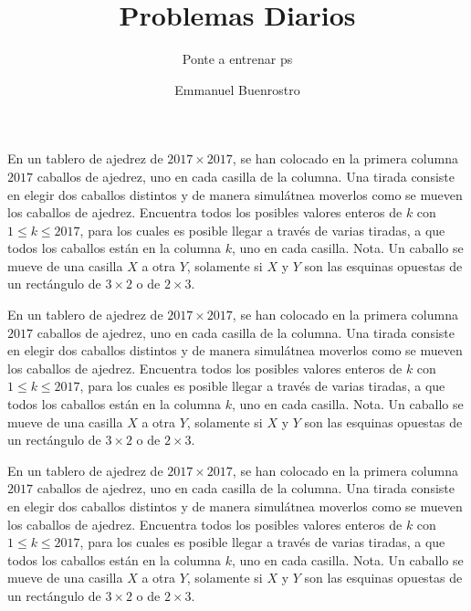 \documentclass[11pt]{scrartcl}
\title {Problemas Diarios}
\subtitle {Ponte a entrenar ps}
\author{Emmanuel Buenrostro}
\begin{document}
\maketitle
\tableofcontents
{}
\begin{problema} [OMM 2017/1]
    
    En un tablero de ajedrez de $2017 \times 2017$, se han colocado en la primera columna $2017$
caballos de ajedrez, uno en cada casilla de la columna. Una tirada consiste en elegir dos
caballos distintos y de manera simulátnea moverlos como se mueven los caballos de ajedrez.
Encuentra todos los posibles valores enteros de $k$ con $1 \leq k \leq 2017$, para los cuales es
posible llegar a través de varias tiradas, a que todos los caballos están en la columna $k$, uno
en cada casilla.
Nota. Un caballo se mueve de una casilla $X$ a otra $Y$, solamente si $X$ y $Y$ son las esquinas
opuestas de un rectángulo de $3 \times 2$ o de $2 \times 3$.
    
\end{problema}
\begin{problema} [OMM 2017/1]
    
    En un tablero de ajedrez de $2017 \times 2017$, se han colocado en la primera columna $2017$
caballos de ajedrez, uno en cada casilla de la columna. Una tirada consiste en elegir dos
caballos distintos y de manera simulátnea moverlos como se mueven los caballos de ajedrez.
Encuentra todos los posibles valores enteros de $k$ con $1 \leq k \leq 2017$, para los cuales es
posible llegar a través de varias tiradas, a que todos los caballos están en la columna $k$, uno
en cada casilla.
Nota. Un caballo se mueve de una casilla $X$ a otra $Y$, solamente si $X$ y $Y$ son las esquinas
opuestas de un rectángulo de $3 \times 2$ o de $2 \times 3$.
    
\end{problema}

\begin{problema} [OMM 2017/1]
    
    En un tablero de ajedrez de $2017 \times 2017$, se han colocado en la primera columna $2017$
caballos de ajedrez, uno en cada casilla de la columna. Una tirada consiste en elegir dos
caballos distintos y de manera simulátnea moverlos como se mueven los caballos de ajedrez.
Encuentra todos los posibles valores enteros de $k$ con $1 \leq k \leq 2017$, para los cuales es
posible llegar a través de varias tiradas, a que todos los caballos están en la columna $k$, uno
en cada casilla.
Nota. Un caballo se mueve de una casilla $X$ a otra $Y$, solamente si $X$ y $Y$ son las esquinas
opuestas de un rectángulo de $3 \times 2$ o de $2 \times 3$.
    
\end{problema}
\end{document}
